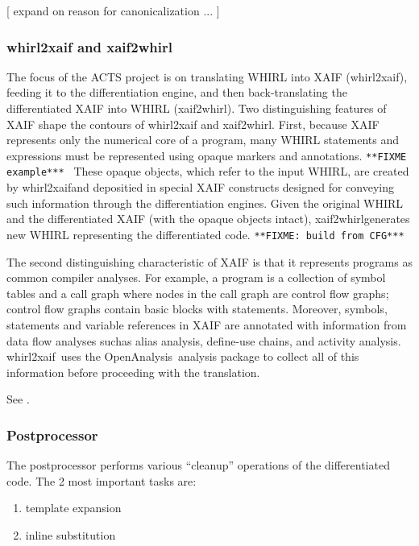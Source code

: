 \documentclass[acmtocl,acmnow]{acmtrans2m}
\newcommand{\OpenAnalysis}{OpenAnalysis}
\newcommand{\whirlToxaif}{whirl2xaif}
\newcommand{\xaifTowhirl}{xaif2whirl}
\begin{document}
[ expand on reason for canonicalization ... ]

\subsubsection*{whirl2xaif and xaif2whirl}

The focus of the ACTS project is on translating WHIRL into XAIF
(\whirlToxaif), feeding it to the differentiation engine, and then
back-translating the differentiated XAIF into WHIRL (\xaifTowhirl).
Two distinguishing features of XAIF shape the contours of \whirlToxaif
and \xaifTowhirl.  First, because XAIF represents only the numerical
core of a program, many WHIRL statements and expressions must be
represented using opaque markers and annotations.  
{\tt ***FIXME example*** } 
These opaque objects, which refer to the input WHIRL, are created by
\whirlToxaif and depositied in special XAIF constructs designed for
conveying such information through the differentiation engines.  Given
the original WHIRL and the differentiated XAIF (with the opaque
objects intact), \xaifTowhirl generates new WHIRL representing the
differentiated code. {\tt ***FIXME: build from CFG***}

The second distinguishing characteristic of XAIF is that it represents
programs as common compiler analyses.  For example, a program is a
collection of symbol tables and a call graph where nodes in the call
graph are control flow graphs; control flow graphs contain basic
blocks with statements.  Moreover, symbols, statements and variable
references in XAIF are annotated with information from data flow
analyses suchas alias analysis, define-use chains, and activity
analysis.  \whirlToxaif\ uses the \OpenAnalysis\ analysis package to
collect all of this information before proceeding with the
translation.

See \cite{RiceTechreport}.


\subsubsection*{Postprocessor}
The postprocessor performs various ``cleanup'' operations of the
differentiated code. The 2 most important tasks are:

   \begin{enumerate}
      \item template expansion
      \item inline substitution
   \end{enumerate}
\end{document}
